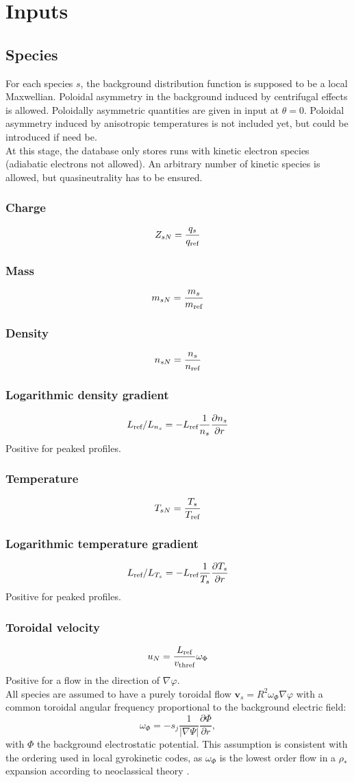 \documentclass[a4paper]{report}
\begin{document}
\chapter{Inputs}
\section{Species}
For each species $s$, the background distribution function is supposed to be a local Maxwellian. Poloidal asymmetry in the background induced by centrifugal effects is allowed. Poloidally asymmetric quantities are given in input at $\theta=0$. Poloidal asymmetry induced by anisotropic temperatures is not included yet, but could be introduced if need be.\\ 
At this stage, the database only stores runs with kinetic electron species (adiabatic electrons not allowed). An arbitrary number of kinetic species is allowed, but quasineutrality has to be ensured.

\subsection{Charge}
$$Z_{sN}=\frac{q_s}{q_{\textrm{ref}}}$$
\subsection{Mass}
$$m_{sN}=\frac{m_s}{m_{\textrm{ref}}}$$
\subsection{Density}
$$n_{sN}=\frac{n_s}{n_{\textrm{ref}}}$$
\subsection{Logarithmic density gradient}
$$L_{\textrm{ref}}/L_{n_s}=-L_{\textrm{ref}} \frac{1}{n_s}\frac{\partial n_s}{\partial r}$$
Positive for peaked profiles. 
\subsection{Temperature}
$$T_{sN}=\frac{T_s}{T_{\textrm{ref}}}$$
\subsection{Logarithmic temperature gradient}
$$L_{\textrm{ref}}/L_{T_s}=-L_{\textrm{ref}} \frac{1}{T_s}\frac{\partial T_s}{\partial r}$$
Positive for peaked profiles.
\subsection{Toroidal velocity}
$$u_{N}=\frac{L_{\textrm{ref}}}{v_\textrm{thref}}\omega_{\Phi}$$
Positive for a flow in the direction of $\nabla \varphi$.\\
All species are assumed to have a purely toroidal flow $\mathbf{v}_s=R^2\omega_\Phi\nabla \varphi$ with a common toroidal angular frequency proportional to the background electric field:
$$\omega_{\Phi}=-s_j\frac{1}{|\nabla \Psi|}\frac{\partial \Phi}{\partial r},$$
with $\Phi$ the background electrostatic potential. This assumption is consistent with the ordering used in local gyrokinetic codes, as $\omega_\Phi$ is the lowest order flow in a $\rho_*$ expansion according to neoclassical theory \cite{Hirshman:NF1981}.
\end{document}
